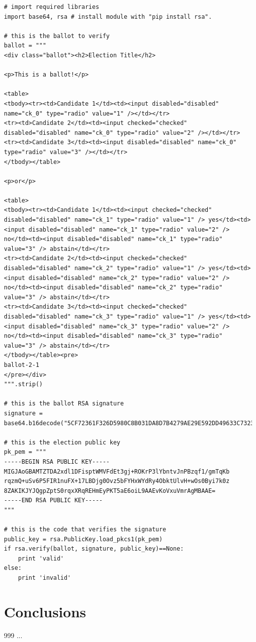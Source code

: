 \documentclass[12pt]{article}
\begin{document}
\begin{verbatim}
# import required libraries
import base64, rsa # install module with "pip install rsa".

# this is the ballot to verify
ballot = """
<div class="ballot"><h2>Election Title</h2>

<p>This is a ballot!</p>

<table>
<tbody><tr><td>Candidate 1</td><td><input disabled="disabled" name="ck_0" type="radio" value="1" /></td></tr>
<tr><td>Candidate 2</td><td><input checked="checked" disabled="disabled" name="ck_0" type="radio" value="2" /></td></tr>
<tr><td>Candidate 3</td><td><input disabled="disabled" name="ck_0" type="radio" value="3" /></td></tr>
</tbody></table>

<p>or</p>

<table>
<tbody><tr><td>Candidate 1</td><td><input checked="checked" disabled="disabled" name="ck_1" type="radio" value="1" /> yes</td><td><input disabled="disabled" name="ck_1" type="radio" value="2" /> no</td><td><input disabled="disabled" name="ck_1" type="radio" value="3" /> abstain</td></tr>
<tr><td>Candidate 2</td><td><input checked="checked" disabled="disabled" name="ck_2" type="radio" value="1" /> yes</td><td><input disabled="disabled" name="ck_2" type="radio" value="2" /> no</td><td><input disabled="disabled" name="ck_2" type="radio" value="3" /> abstain</td></tr>
<tr><td>Candidate 3</td><td><input checked="checked" disabled="disabled" name="ck_3" type="radio" value="1" /> yes</td><td><input disabled="disabled" name="ck_3" type="radio" value="2" /> no</td><td><input disabled="disabled" name="ck_3" type="radio" value="3" /> abstain</td></tr>
</tbody></table><pre>
ballot-2-1
</pre></div>
""".strip()

# this is the ballot RSA signature
signature = base64.b16decode("5CF72361F326D5980C8B031DA8D7B4279AE29E592DD49633C73232F7CD752D05DE32C09A359D44AB2D243FBBAA2185872CC3CB0A26EFDBAFDB69B207FD97B4D13B87E8421B848C817D191A97A3B5BB377637975AA4C52C81DF35E2B29B8B9F9D9B0E6E0473071E1D2279BC5A7434DB620AD4D7A7E22DBB711782CF614EAEE246")

# this is the election public key
pk_pem = """
-----BEGIN RSA PUBLIC KEY-----
MIGJAoGBAMTZTDA2xdl1DFisptWMVFdEt3gj+ROKrP3lYbntvJnPBzqf1/gmTqKb
rqzmQ+uSv6P5FIR1nuFX+17LBDjg0Ovz5bFYHxWYdRy4ObktUlvH+wOs0Byi7k0z
8ZAKIKJYJQgpZptS0rqxXRqREHmEyPKT5aE6oiL9AAEvKoVxuVmrAgMBAAE=
-----END RSA PUBLIC KEY-----
"""

# this is the code that verifies the signature
public_key = rsa.PublicKey.load_pkcs1(pk_pem)
if rsa.verify(ballot, signature, public_key)==None:
    print 'valid'
else:
    print 'invalid'
\end{verbatim}

\section{Conclusions}

\begin{thebibliography}{999}
 ...
\end{thebibliography}
\end{document}
